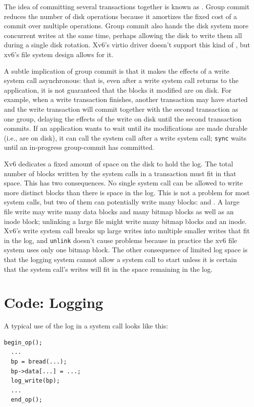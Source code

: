 The idea of committing several transactions together is known as 
.
Group commit reduces the number of disk operations
because it amortizes the fixed cost of a commit over multiple
operations.
Group commit also hands the disk system more concurrent writes
at the same time, perhaps allowing the disk to write
them all during a single disk rotation.
Xv6's virtio driver doesn't support this kind of
,
but xv6's file system design allows for it.

A subtle implication of group commit is
that it makes the effects of a write system call asynchronous:
that is, even after a write system call returns to the application, it is not guaranteed that
the blocks it modified are on disk.
For example, when a write transaction finishes, 
another transaction may have started and the write transaction will
commit together with the second transaction as one group, delaying the
effects of the write on disk until the second transaction commits.
If an application wants to wait until its modifications are made durable
(i.e., are on disk),
it can call the   system call after a write system call;
\lstinline{sync} waits until an in-progress group-commit has committed.


Xv6 dedicates a fixed amount of space on the disk to hold the log.
The total number of blocks written by the system calls in a
transaction must fit in that space.
This has two consequences.
No single system call
can be allowed to write more distinct blocks than there is space
in the log. This is not a problem for most system calls, but two
of them can potentially write many blocks: 
and
.
A large file write may write many data blocks and many bitmap blocks
as well as an inode block; unlinking a large file might write many
bitmap blocks and an inode.
Xv6's write system call breaks up large writes into multiple smaller
writes that fit in the log,
and 
\lstinline{unlink}
doesn't cause problems because in practice the xv6 file system uses
only one bitmap block.
The other consequence of limited log space
is that the logging system cannot allow a system call to start
unless it is certain that the system call's writes will
fit in the space remaining in the log.
\section{Code: Logging}
\label{s:code-logging}

A typical use of the log in a system call looks like this:
\begin{lstlisting}[]
  begin_op();
  ...
  bp = bread(...);
  bp->data[...] = ...;
  log_write(bp);
  ...
  end_op();
\end{lstlisting}

